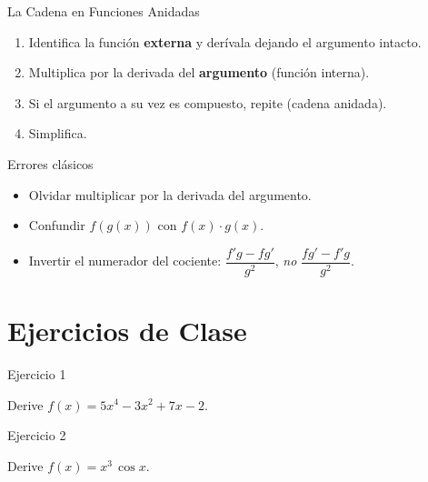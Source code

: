 \documentclass[aspectratio=169]{beamer}
\begin{document}
\begin{frame}{La Cadena en Funciones Anidadas}
  \begin{mwpasos}
    \begin{enumerate}
      \item Identifica la función \textbf{externa} y derívala dejando el argumento intacto.
      \item Multiplica por la derivada del \textbf{argumento} (función interna).
      \item Si el argumento a su vez es compuesto, repite (cadena anidada).
      \item Simplifica.
    \end{enumerate}
  \end{mwpasos}
  \vspace{6pt}
  \begin{alertblock}{Errores clásicos}
    \begin{itemize}
      \item Olvidar multiplicar por la derivada del argumento.
      \item Confundir $f(g(x))$ con $f(x)\cdot g(x)$.
      \item Invertir el numerador del cociente: $\dfrac{f'g - fg'}{g^2}$, \emph{no} $\dfrac{fg' - f'g}{g^2}$.
    \end{itemize}
  \end{alertblock}
\end{frame}

\section{Ejercicios de Clase}

\begin{frame}{Ejercicio 1}
  \begin{mwejercicio}
    Derive $f(x) = 5x^4 - 3x^2 + 7x - 2$.
  \end{mwejercicio}
\end{frame}

\begin{frame}{Ejercicio 2}
  \begin{mwejercicio}
    Derive $f(x) = x^3\,\cos x$.
  \end{mwejercicio}
\end{frame}
\end{document}
